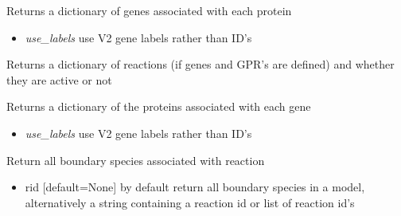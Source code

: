 \documentclass[a4paper,11pt,english]{sphinxmanual}
\begin{document}
\begin{fulllineitems}
\begin{fulllineitems}
\end{fulllineitems}


\begin{fulllineitems}
\label{modules_doc:cbmpy.CBModel.Model.getAllGeneProteinAssociations}
Returns a dictionary of genes associated with each protein
\begin{itemize}
\item {} 
\emph{use\_labels} use V2 gene labels rather than ID's

\end{itemize}

\end{fulllineitems}


\begin{fulllineitems}
\label{modules_doc:cbmpy.CBModel.Model.getAllProteinActivities}
Returns a dictionary of reactions (if genes and GPR's are defined) and whether they are active or not

\end{fulllineitems}


\begin{fulllineitems}
\label{modules_doc:cbmpy.CBModel.Model.getAllProteinGeneAssociations}
Returns a dictionary of the proteins associated with each gene
\begin{itemize}
\item {} 
\emph{use\_labels} use V2 gene labels rather than ID's

\end{itemize}

\end{fulllineitems}


\begin{fulllineitems}
\label{modules_doc:cbmpy.CBModel.Model.getBoundarySpeciesIds}
Return all boundary species associated with reaction
\begin{itemize}
\item {} 
rid {[}default=None{]} by default return all boundary species in a model, alternatively a string containing a reaction id or list of reaction id's


\end{itemize}
\end{fulllineitems}
\end{fulllineitems}
\end{document}
